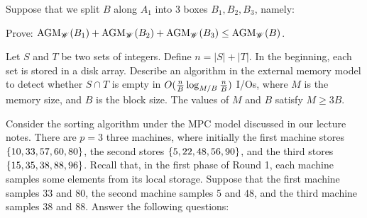 \vgap

Suppose that we split $B$ along $A_1$ into 3 boxes $B_1, B_2, B_3$, namely:

\noindent Prove: $\text{AGM}_{\mathscr{W}}(B_1) + \text{AGM}_{\mathscr{W}}(B_2) + \text{AGM}_{\mathscr{W}}(B_3) \le \text{AGM}_{\mathscr{W}}(B)$.

\pagebreak

 Let $S$ and $T$ be two sets of integers. Define $n = |S| + |T|$. In the beginning, each set is stored in a disk array. Describe an algorithm in the external memory model to detect whether $S \cap T$ is empty in $O(\frac{n}{B} \log_{M/B} \frac{n}{B})$ I/Os, where $M$ is the memory size, and $B$ is the block size. The values of $M$ and $B$ satisfy $M \ge 3B$.

\pagebreak

 Consider the sorting algorithm under the MPC model discussed in our lecture notes. There are $p = 3$ three machines, where initially the first machine stores $\{10, 33, 57, 60, 80\}$, the second stores $\{5, 22, 48, 56, 90\}$, and the third stores $\{15, 35, 38, 88, 96\}$. Recall that, in the first phase of Round 1, each machine samples some elements from its local storage. Suppose that the first machine samples 33 and 80, the second machine samples 5 and 48, and the third machine samples 38 and 88. Answer the following questions:

\vgap



